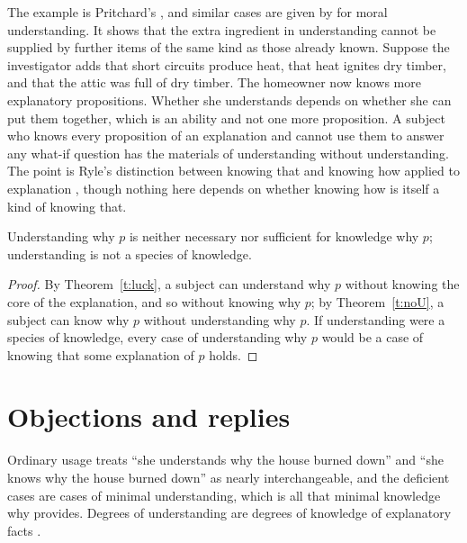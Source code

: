 \documentclass{situationist-preprint}
\begin{document}
The example is Pritchard's \citep{Pritchard2010}, and similar cases are given by \citet{Hills2016} for moral understanding. It shows that the extra ingredient in understanding cannot be supplied by further items of the same kind as those already known. Suppose the investigator adds that short circuits produce heat, that heat ignites dry timber, and that the attic was full of dry timber. The homeowner now knows more explanatory propositions. Whether she understands depends on whether she can put them together, which is an ability and not one more proposition. A subject who knows every proposition of an explanation and cannot use them to answer any what-if question has the materials of understanding without understanding. The point is Ryle's distinction between knowing that and knowing how applied to explanation \citep{Ryle1949}, though nothing here depends on whether knowing how is itself a kind of knowing that.

\begin{corollary}\label{c:neither}
Understanding why $p$ is neither necessary nor sufficient for knowledge why $p$; understanding is not a species of knowledge.
\end{corollary}

\begin{proof}
By Theorem~\ref{t:luck}, a subject can understand why $p$ without knowing the core of the explanation, and so without knowing why $p$; by Theorem~\ref{t:noU}, a subject can know why $p$ without understanding why $p$. If understanding were a species of knowledge, every case of understanding why $p$ would be a case of knowing that some explanation of $p$ holds.
\end{proof}

\section{Objections and replies}

\begin{objection}\label{o:sliwa}
Ordinary usage treats \enquote{she understands why the house burned down} and \enquote{she knows why the house burned down} as nearly interchangeable, and the deficient cases are cases of minimal understanding, which is all that minimal knowledge why provides. Degrees of understanding are degrees of knowledge of explanatory facts \citep{Sliwa2015}.
\end{objection}
\end{document}
